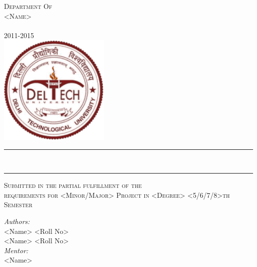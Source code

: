 \begin{titlepage}
\begin{center}

\textsc{\LARGE Department Of}\\[0.5cm]
\textsc{\LARGE <Name>}\\[1.0cm]
\textsc{}\\[1.0cm]
\textsc{\LARGE 2011-2015}\\[1.0cm]

\includegraphics[width=0.4\textwidth]{../Figures/logo}~\\[1cm]

\hrule \vspace{0.3cm}
{ \huge \bfseries <Project Title>\\[0.4cm] }
\hrule \vspace{1.0cm}

\textsc{Submitted in the partial fulfillment of the}\\[0.2cm]
\textsc{requirements for <Minor/Major> Project in <Degree> <5/6/7/8>th Semester}\\[0.2cm]

\vspace{0.3cm}

\large \emph{Authors:}\\
\large <Name> <Roll No>\\
\large <Name> <Roll No>\\

\vspace{0.1cm}
\large \emph{Mentor:} \\
\large <Name>



\end{center}
\end{titlepage}